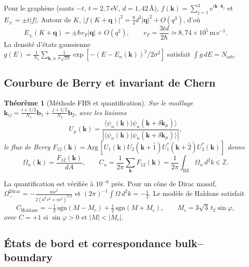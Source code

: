 \documentclass[11pt,a4paper,french]{article}
\newtheorem{theoreme}{Théorème}
\begin{document}
Pour le graphène (sauts $-t$, $t=2{,}7$\,eV, $d=1{,}42$\,Å), $f(\mathbf{k})=\sum_{j=1}^{3}e^{i\mathbf{k}\cdot\boldsymbol{\delta}_j}$ et $E_\pm=\pm t|f|$. Autour de $K$, $|f(K+\mathbf{q})|^2=\frac{9}{4}d^2|\mathbf{q}|^2+O(q^3)$, d'où
\begin{equation}
  E_\pm(K+\mathbf{q}) = \pm\hbar v_F|\mathbf{q}| + O(q^2),
  \qquad v_F=\frac{3td}{2\hbar}\simeq 8{,}74\times10^{5}\,\mathrm{m\,s^{-1}}.
  \label{eq:dirac}
\end{equation}
La densité d'états gaussienne $g(E)=\frac{1}{N_k}\sum_{\mathbf{k},n}\frac{1}{\sigma\sqrt{2\pi}}\exp[-(E-E_n(\mathbf{k}))^2/2\sigma^2]$ satisfait $\int g\,dE=N_{\mathrm{orb}}$.

\subsection{Courbure de Berry et invariant de Chern}

\begin{theoreme}[Méthode FHS et quantification]
Sur le maillage $\mathbf{k}_{ij}=\frac{i+1/2}{N_1}\mathbf{b}_1+\frac{j+1/2}{N_2}\mathbf{b}_2$, avec les liaisons
\begin{equation}
  U_\mu(\mathbf{k}) = \frac{\langle\psi_n(\mathbf{k})|\psi_n(\mathbf{k}+\delta\mathbf{k}_\mu)\rangle}
  {\left|\langle\psi_n(\mathbf{k})|\psi_n(\mathbf{k}+\delta\mathbf{k}_\mu)\rangle\right|},
  \label{eq:link}
\end{equation}
le flux de Berry $F_{12}(\mathbf{k})=\mathrm{Arg}\,[U_1(\mathbf{k})U_2(\mathbf{k}+\hat{1})U_1^{*}(\mathbf{k}+\hat{2})U_2^{*}(\mathbf{k})]$ donne
\begin{equation}
  \Omega_n(\mathbf{k}) = \frac{F_{12}(\mathbf{k})}{dA},
  \qquad
  C_n = \frac{1}{2\pi}\sum_{\mathbf{k}}F_{12}(\mathbf{k})
  = \frac{1}{2\pi}\int_{\mathrm{BZ}}\Omega_n\,d^2k \in \mathbb{Z}.
  \label{eq:chern}
\end{equation}
\end{theoreme}
La quantification est vérifiée à $10^{-6}$ près. Pour un cône de Dirac massif, $\Omega_-^{\mathrm{Dirac}}=-\frac{mv^2}{2(k^2v^2+m^2)^{3/2}}$ et $(2\pi)^{-1}\int\Omega\,d^2k=-\tfrac12$. Le modèle de Haldane satisfait
\begin{equation}
  C_{\mathrm{Haldane}}=-\tfrac12\,\mathrm{sgn}(M-M_c)+\tfrac12\,\mathrm{sgn}(M+M_c),
  \qquad M_c=3\sqrt{3}\,t_2\sin\varphi,
  \label{eq:haldane}
\end{equation}
avec $C=+1$ si $\sin\varphi>0$ et $|M|<|M_c|$.

\subsection{États de bord et correspondance bulk--boundary}
\end{document}
